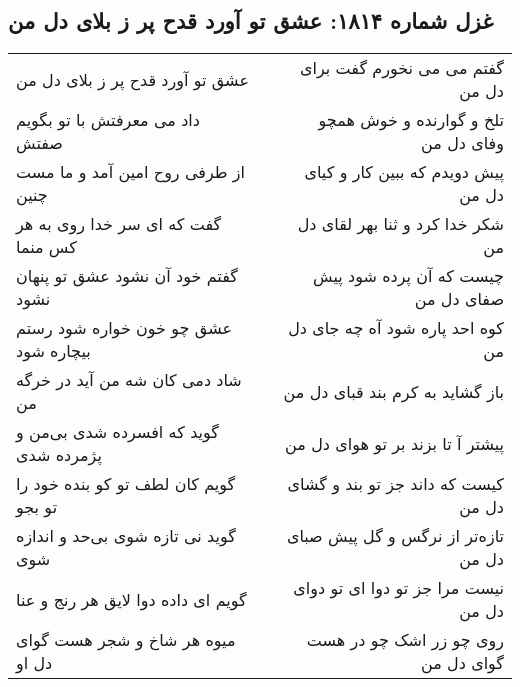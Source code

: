 \begin{center}
\section*{غزل شماره ۱۸۱۴: عشق تو آورد قدح پر ز بلای دل من}
\label{sec:1814}
\begin{longtable}{l p{0.5cm} r}
عشق تو آورد قدح پر ز بلای دل من
&&
گفتم می می نخورم گفت برای دل من
\\
داد می معرفتش با تو بگویم صفتش
&&
تلخ و گوارنده و خوش همچو وفای دل من
\\
از طرفی روح امین آمد و ما مست چنین
&&
پیش دویدم که ببین کار و کیای دل من
\\
گفت که ای سر خدا روی به هر کس منما
&&
شکر خدا کرد و ثنا بهر لقای دل من
\\
گفتم خود آن نشود عشق تو پنهان نشود
&&
چیست که آن پرده شود پیش صفای دل من
\\
عشق چو خون خواره شود رستم بیچاره شود
&&
کوه احد پاره شود آه چه جای دل من
\\
شاد دمی کان شه من آید در خرگه من
&&
باز گشاید به کرم بند قبای دل من
\\
گوید که افسرده شدی بی‌من و پژمرده شدی
&&
پیشتر آ تا بزند بر تو هوای دل من
\\
گویم کان لطف تو کو بنده خود را تو بجو
&&
کیست که داند جز تو بند و گشای دل من
\\
گوید نی تازه شوی بی‌حد و اندازه شوی
&&
تازه‌تر از نرگس و گل پیش صبای دل من
\\
گویم ای داده دوا لایق هر رنج و عنا
&&
نیست مرا جز تو دوا ای تو دوای دل من
\\
میوه هر شاخ و شجر هست گوای دل او
&&
روی چو زر اشک چو در هست گوای دل من
\\
\end{longtable}
\end{center}
